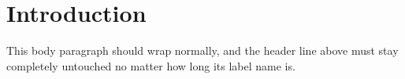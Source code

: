 \section{Introduction}\label{sec:intro}

This body paragraph should wrap
normally, and the header line above must
stay completely untouched no matter how
long its label name is.
